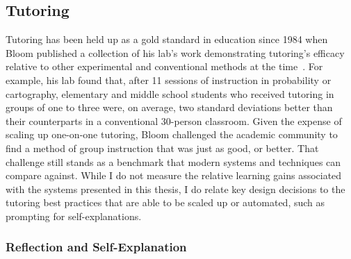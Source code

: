 

\subsection{Tutoring}

Tutoring has been held up as a gold standard in education since 1984 when Bloom published a collection of his lab's work demonstrating tutoring's efficacy relative to other experimental and conventional methods at the time~\cite{bloom}. For example, his lab found that, after 11 sessions of instruction in probability or cartography, elementary and middle school students who received tutoring in groups of one to three were, on average, two standard deviations better than their counterparts in a conventional 30-person classroom. Given the expense of scaling up one-on-one tutoring, Bloom challenged the academic community to find a method of group instruction that was just as good, or better. That challenge still stands as a benchmark that modern systems and techniques can compare against. While I do not measure the relative learning gains associated with the systems presented in this thesis, I do relate key design decisions to the tutoring best practices that are able to be scaled up or automated, such as prompting for self-explanations.%

\subsubsection{Reflection and Self-Explanation}

